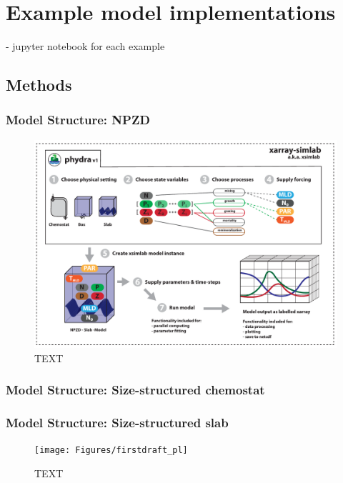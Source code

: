 \documentclass[journal abbreviation, manuscript]{copernicus}
\begin{document}
\section{Example model implementations}
- jupyter notebook for each example

\subsection{Methods}

\subsubsection{Model Structure: NPZD}

\begin{figure}[t]
\includegraphics[width=12cm]{Figures/firstdraft_schematics/01__schematics_phydra.pdf}
\caption{TEXT}
\label{phydraschematics}
\end{figure}

\subsubsection{Model Structure: Size-structured chemostat}

\subsubsection{Model Structure: Size-structured slab}
\begin{figure}[t]
\texttt{[image: Figures/firstdraft\_pl]}
\caption{TEXT}
\label{phydraschematics}
\end{figure}
\end{document}
